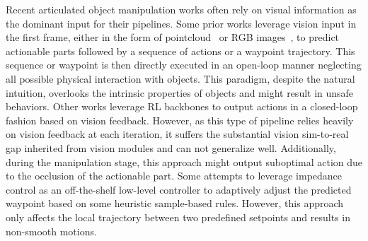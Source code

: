 Recent articulated object manipulation works often rely on visual information as the dominant input for their pipelines. Some prior works leverage vision input in the first frame, either in the form of pointcloud~\cite{coarse,gapartnet,eisner2022flowbot3d} or RGB images~\cite{rgbmanip,dooropen,vrb,where2act, where2explore, gapartnet}, to predict actionable parts followed by a sequence of actions or a waypoint trajectory. This sequence or waypoint is then directly executed in an open-loop manner neglecting all possible physical interaction with objects. This paradigm, despite the natural intuition, overlooks the intrinsic properties of objects and might result in unsafe behaviors. Other works leverage RL backbones \cite{partmanip, umpnet, rlafford, li2024unidoormanip} to output actions in a closed-loop fashion based on vision feedback. However, as this type of pipeline relies heavily on vision feedback at each iteration, it suffers the substantial vision sim-to-real gap inherited from vision modules \cite{dooropen, gapartnet} and can not generalize well. Additionally, during the manipulation stage, this approach might output suboptimal action due to the occlusion of the actionable part. Some \cite{rgbmanip} attempts to leverage impedance control as an off-the-shelf low-level controller to adaptively adjust the predicted waypoint based on some heuristic sample-based rules. However, this approach only affects the local trajectory between two predefined setpoints and results in non-smooth motions.


